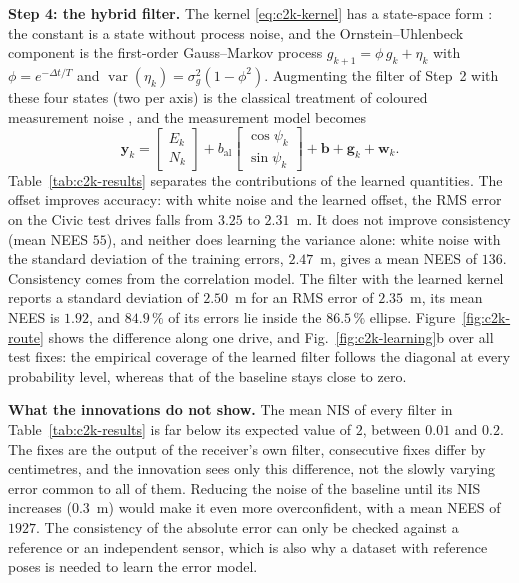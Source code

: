 \textbf{Step 4: the hybrid filter.} The kernel \eqref{eq:c2k-kernel} has a state-space form \cite{rasmussen2006_gp}: the constant is a state without process noise, and the Ornstein--Uhlenbeck component is the first-order Gauss--Markov process $g_{k+1}=\phi\,g_k+\eta_k$ with $\phi=e^{-\Delta t/T}$ and $\operatorname{var}(\eta_k)=\sigma_g^{2}(1-\phi^{2})$. Augmenting the filter of Step~2 with these four states (two per axis) is the classical treatment of coloured measurement noise \cite{barshalom2001_estimation}, and the measurement model becomes
\begin{equation}
\mathbf{y}_k=\begin{bmatrix}E_k\\ N_k\end{bmatrix}+b_{\mathrm{al}}\begin{bmatrix}\cos\psi_k\\ \sin\psi_k\end{bmatrix}+\mathbf{b}+\mathbf{g}_k+\mathbf{w}_k .
\label{eq:c2k-measurement}
\end{equation}
Table~\ref{tab:c2k-results} separates the contributions of the learned quantities. The offset improves accuracy: with white noise and the learned offset, the RMS error on the Civic test drives falls from $3.25$ to $2.31$~m. It does not improve consistency (mean NEES $55$), and neither does learning the variance alone: white noise with the standard deviation of the training errors, $2.47$~m, gives a mean NEES of $136$. Consistency comes from the correlation model. The filter with the learned kernel reports a standard deviation of $2.50$~m for an RMS error of $2.35$~m, its mean NEES is $1.92$, and $84.9\,\%$ of its errors lie inside the $86.5\,\%$ ellipse. Figure~\ref{fig:c2k-route} shows the difference along one drive, and Fig.~\ref{fig:c2k-learning}b over all test fixes: the empirical coverage of the learned filter follows the diagonal at every probability level, whereas that of the baseline stays close to zero.

\textbf{What the innovations do not show.} The mean NIS of every filter in Table~\ref{tab:c2k-results} is far below its expected value of $2$, between $0.01$ and $0.2$. The fixes are the output of the receiver's own filter, consecutive fixes differ by centimetres, and the innovation sees only this difference, not the slowly varying error common to all of them. Reducing the noise of the baseline until its NIS increases ($0.3$~m) would make it even more overconfident, with a mean NEES of $1927$. The consistency of the absolute error can only be checked against a reference or an independent sensor, which is also why a dataset with reference poses is needed to learn the error model.

